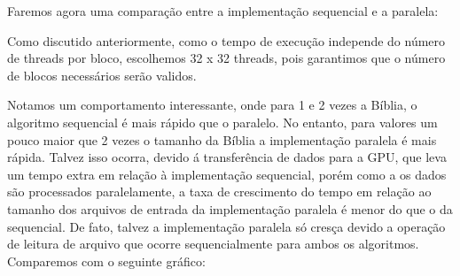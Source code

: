 \documentclass[12pt]{article}
\begin{document}
Faremos agora uma comparação entre a implementação sequencial e a paralela:

\begin{figure}[H]
\end{figure}

Como discutido anteriormente, como o tempo de execução independe do
número de threads por bloco, escolhemos 32 x 32 threads, pois
garantimos que o número de blocos necessários serão validos.

Notamos um comportamento interessante, onde para 1 e 2 vezes a Bíblia,
o algoritmo sequencial é mais rápido que o paralelo. No entanto,
para valores um pouco maior que 2 vezes o tamanho da Bíblia a
implementação paralela é mais rápida. Talvez isso ocorra, devido á
transferência de dados para a GPU, que leva um tempo extra em relação à
implementação sequencial, porém como a os dados são processados
paralelamente, a taxa de crescimento do tempo em relação ao tamanho dos
arquivos de entrada da implementação paralela é menor do que o da
sequencial. De fato, talvez a implementação paralela só cresça devido a
operação de leitura de arquivo que ocorre sequencialmente para ambos os
algoritmos. Comparemos com o seguinte gráfico:

\begin{figure}[H]
\end{figure}
\end{document}
